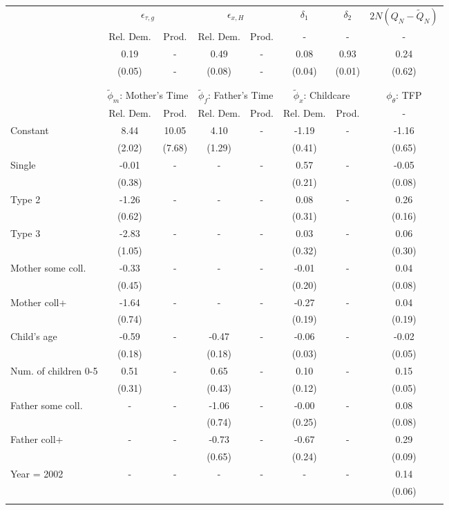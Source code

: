 \begin{tabular}{lccccccc}\toprule
 & \multicolumn{2}{c}{$\epsilon_{\tau,g}$} & \multicolumn{2}{c}{$\epsilon_{x,H}$} & {$\delta_{1}$} & {$\delta_{2}$} & $2N(Q_{N} - \tilde{Q}_{N})$ \\
 & Rel. Dem. & Prod. & Rel. Dem. & Prod. & - & - & - \\\cmidrule(r){2-3}\cmidrule(r){4-5}\cmidrule(r){6-6}\cmidrule(r){7-7}\cmidrule(r){8-8}
&0.19& - &0.49& - &0.08&0.93&0.24\\
&(0.05)& - &(0.08)& - &(0.04)&(0.01)&(0.62)\\
\\
&&&&&&&\\
 & \multicolumn{2}{c}{$\tilde{\phi}_{m}$: Mother's Time} & \multicolumn{2}{c}{$\tilde{\phi}_{f}$: Father's Time} & \multicolumn{2}{c}{$\tilde{\phi}_{x}$: Childcare} &{$\phi_{\theta}$: TFP} \\
 & Rel. Dem. & Prod. & Rel. Dem. & Prod. & Rel. Dem. & Prod. & -  \\\cmidrule(r){2-3}\cmidrule(r){4-5}\cmidrule(r){6-7}\cmidrule(r){8-8}
Constant&8.44&10.05&4.10& -&-1.19& -&-1.16\\
&(2.02)&(7.68)&(1.29)&&(0.41)&&(0.65)\\
Single&-0.01& -& - & -&0.57& -&-0.05\\
&(0.38)& & &&(0.21)&&(0.08)\\
Type 2&-1.26& -& - & -&0.08& -&0.26\\
&(0.62)& & &&(0.31)&&(0.16)\\
Type 3&-2.83& -& - & -&0.03& -&0.06\\
&(1.05)& & &&(0.32)&&(0.30)\\
Mother some coll.&-0.33& -& - & -&-0.01& -&0.04\\
&(0.45)& & &&(0.20)&&(0.08)\\
Mother coll+&-1.64& -& - & -&-0.27& -&0.04\\
&(0.74)& & &&(0.19)&&(0.19)\\
Child's age&-0.59& -&-0.47& -&-0.06& -&-0.02\\
&(0.18)&&(0.18)&&(0.03)&&(0.05)\\
Num. of children 0-5&0.51& -&0.65& -&0.10& -&0.15\\
&(0.31)&&(0.43)&&(0.12)&&(0.05)\\
Father some coll.& - & -&-1.06& -&-0.00& -&0.08\\
 & &&(0.74)&&(0.25)&&(0.08)\\
Father coll+& - & -&-0.73& -&-0.67& -&0.29\\
 & &&(0.65)&&(0.24)&&(0.09)\\
Year = 2002& - & -& - & -& - & -&0.14\\
 & & & & & &&(0.06)\\
\\
\bottomrule\end{tabular}